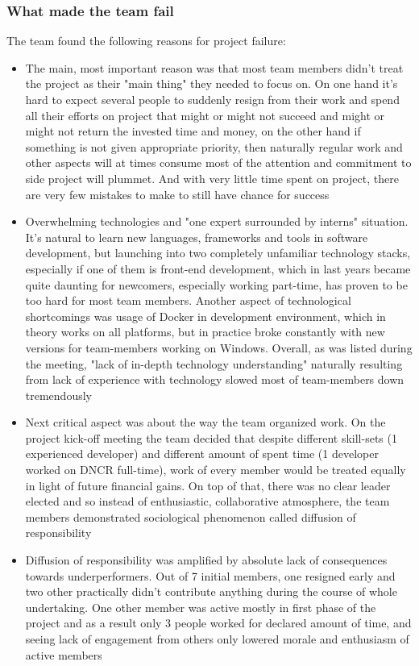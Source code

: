\documentclass{article}
\begin{document}
\subsubsection{What made the team fail}
The team found the following reasons for project failure:
\begin{itemize}
\item The main, most important reason was that most team members didn't treat the project as their "main thing" they needed to focus on. On one hand it's hard to expect several people to suddenly resign from their work and spend all their efforts on project that might or might not succeed and might or might not return the invested time and money, on the other hand if something is not given appropriate priority, then naturally regular work and other aspects will at times consume most of the attention and commitment to side project will plummet. And with very little time spent on project, there are very few mistakes to make to still have chance for success
\item Overwhelming technologies and "one expert surrounded by interns" situation. It's natural to learn new languages, frameworks and tools in software development, but launching into two completely unfamiliar technology stacks, especially if one of them is front-end development, which in last years became quite daunting for newcomers, especially working part-time, has proven to be too hard for most team members. Another aspect of technological shortcomings was usage of Docker in development environment, which in theory works on all platforms, but in practice broke constantly with new versions for team-members working on Windows. Overall, as was listed during the meeting, "lack of in-depth technology understanding" naturally resulting from lack of experience with technology slowed most of team-members down tremendously
\item Next critical aspect was about the way the team organized work. On the project kick-off meeting the team decided that despite different skill-sets (1 experienced developer) and different amount of spent time (1 developer worked on DNCR full-time), work of every member would be treated equally in light of future financial gains. On top of that, there was no clear leader elected and so instead of enthusiastic, collaborative atmosphere, the team members demonstrated sociological phenomenon called diffusion of responsibility
\item Diffusion of responsibility was amplified by absolute lack of consequences towards underperformers. Out of 7 initial members, one resigned early and two other practically didn't contribute anything during the course of whole undertaking. One other member was active mostly in first phase of the project and as a result only 3 people worked for declared amount of time, and seeing lack of engagement from others only lowered morale and enthusiasm of active members 

\end{itemize}
\end{document}
